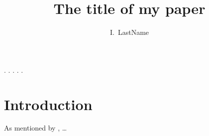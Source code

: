 \documentclass{assets/aa}
\begin{document}
\title{The title of my paper}

\author{
  I.~LastName \inst{\ref{inst}} 
}


\abstract%
    {.}
    {.}
    {.}
    {.}
    {.}




\maketitle

\section{Introduction}

As mentioned by \cite{einstein:1905:EBK}, \ldots



\end{document}
